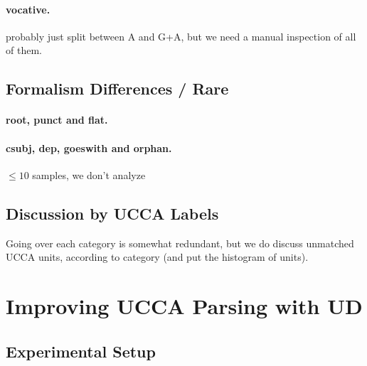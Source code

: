 \documentclass[11pt,a4paper]{article}
\begin{document}
\paragraph{vocative.}
probably just split between A and G+A, but we need a manual inspection of all of them.



\subsection{Formalism Differences / Rare}

\paragraph{root, punct and flat.}

\paragraph{csubj, dep, goeswith and orphan.}
$\leq 10$ samples, we don't analyze


\subsection{Discussion by UCCA Labels}

Going over each category is somewhat redundant, but we do discuss unmatched UCCA units, according to category (and put the histogram of units).



\section{Improving UCCA Parsing with UD}\label{}

\subsection{Experimental Setup}\label{sec:experiments}
\end{document}
